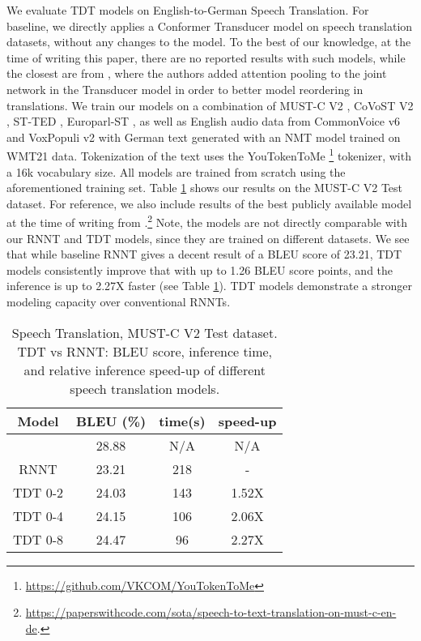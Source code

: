 \documentclass{article}
\begin{document}
We evaluate TDT models on English-to-German Speech Translation. 
For baseline, we directly applies a Conformer Transducer model on speech translation datasets, without any changes to the model. To the best of our knowledge, at the time of writing this paper, there are no reported results with such models, while the closest are from \cite{xue2022large}, where the authors added attention pooling to the joint network in the Transducer model in order to better model reordering in translations.
We train our models on a combination of MUST-C V2  \cite{cattoni2021must}, CoVoST V2 \cite{wang2020covost}, ST-TED \cite{niehues-etal-2018-iwslt}, Europarl-ST \cite{iranzo2020europarl}, as well as English audio data from CommonVoice v6 and VoxPopuli v2 with German text generated with an NMT model trained on WMT21 \cite{farhad2021findings} data.
Tokenization of the text uses the YouTokenToMe \footnote{\url{https://github.com/VKCOM/YouTokenToMe}} tokenizer, with a 16k vocabulary size.
All models are trained from scratch using the aforementioned training set. 
Table \ref{ST_results}
shows our results on the MUST-C V2 Test dataset. For reference, we also include results of the best publicly available model at the time of writing  from \cite{indurthi2021task}.\footnote{\url{https://paperswithcode.com/sota/speech-to-text-translation-on-must-c-en-de}.} Note,  the models are not directly comparable with our RNNT and TDT models, since they are trained on different datasets. We see that while baseline RNNT gives a decent result of a BLEU score of 23.21, TDT models consistently improve that with up to 1.26 BLEU score points, and the inference is up to 2.27X faster (see  Table \ref{ST_results}). TDT models demonstrate a stronger modeling capacity over conventional RNNTs.

\begin{table}[h]
    \centering
    \begin{tabular}{cccc}
    \toprule
        Model & BLEU (\%) & time(s) & speed-up \\
    \midrule
\cite{indurthi2021task}          & 28.88 & N/A & N/A  \\
\midrule
        RNNT & 23.21 & 218  &  - \\
        TDT 0-2      & 24.03 & 143  & 1.52X \\
        TDT 0-4      & 24.15 & 106  & 2.06X \\
        TDT 0-8      & 24.47 & 96   & 2.27X \\
        \bottomrule
    \end{tabular}
    \caption{Speech Translation, MUST-C V2 Test dataset. TDT vs RNNT: BLEU score, inference time, and relative inference speed-up of different speech translation models.}
    \label{ST_results}
\end{table}
\end{document}
